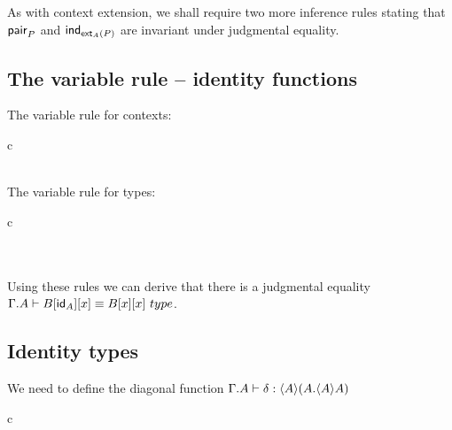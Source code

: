 As with context extension, we shall require two more inference rules stating that
$\mathsf{pair}_P$ and $\mathsf{ind}_{\mathsf{ext}_A(P)}$ are invariant under judgmental equality.

\subsection{The variable rule -- identity functions}
The variable rule for contexts:
\begin{infarray}{c}
\inference{\jctx{\Gamma}}{\jtermt{\Gamma}{\ctxwk{\Gamma}{\Gamma}}{\idfunc[\Gamma]}}\\
\\
\end{infarray}


The variable rule for types:
\begin{infarray}{c}
\\
\\
\\
\end{infarray}

Using these rules we can derive that there is a judgmental equality $\jtypeeq{\ctxext{\Gamma}{A}}{\subst{x}{{\idfunc[A]}{B}}}
{\subst{x}{{x}{B}}}$.

\subsection{Identity types}
We need to define the diagonal function $\jtermt{\ctxext{\Gamma}{A}}{\ctxwk{A}{\ctxext{A}{\ctxwk{A}{A}}}}{\delta}$
\begin{infarray}{c}
\\
\\
{}
\end{infarray}

